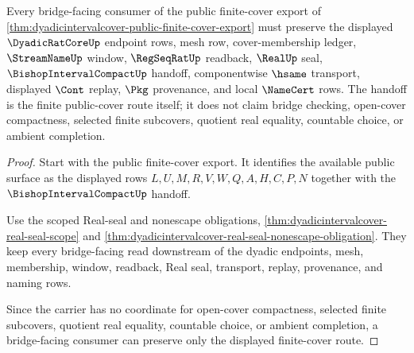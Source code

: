 \begin{theorem}
\label{thm:dyadic-interval-cover-bridge-handoff}
Every bridge-facing consumer of the public finite-cover export of \autoref{thm:dyadicintervalcover-public-finite-cover-export} must preserve the displayed $\DyadicRatCoreUp$ endpoint rows, mesh row, cover-membership ledger, $\StreamNameUp$ window, $\RegSeqRatUp$ readback, $\RealUp$ seal, $\BishopIntervalCompactUp$ handoff, componentwise $\hsame$ transport, displayed $\Cont$ replay, $\Pkg$ provenance, and local $\NameCert$ rows. The handoff is the finite public-cover route itself; it does not claim bridge checking, open-cover compactness, selected finite subcovers, quotient real equality, countable choice, or ambient completion.
\end{theorem}
\begin{proof}
Start with the public finite-cover export. It identifies the available public surface as the displayed rows $L,U,M,R,V,W,Q,A,H,C,P,N$ together with the $\BishopIntervalCompactUp$ handoff.

Use the scoped Real-seal and nonescape obligations, \autoref{thm:dyadicintervalcover-real-seal-scope} and \autoref{thm:dyadicintervalcover-real-seal-nonescape-obligation}. They keep every bridge-facing read downstream of the dyadic endpoints, mesh, membership, window, readback, Real seal, transport, replay, provenance, and naming rows.

Since the carrier has no coordinate for open-cover compactness, selected finite subcovers, quotient real equality, countable choice, or ambient completion, a bridge-facing consumer can preserve only the displayed finite-cover route.
\end{proof}

